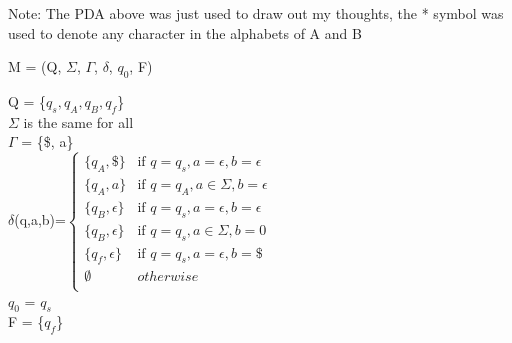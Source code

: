 \documentclass[12pt]{report}
\begin{document}
\begin{flushleft}
	{\footnotesize Note: The PDA above was just used to draw out my thoughts, the * symbol was used to denote any character in the alphabets of A and B}
\end{flushleft}

\pagebreak

M = (Q, $\Sigma$, $\Gamma$, $\delta$, $q_0$, F)
\begin{addmargin}[1cm]{0em}
	Q = \{$q_s, q_A, q_B, q_f$\}\\
	$\Sigma$ is the same for all\\
	$\Gamma$ = \{\$, a\}\\
	$\delta$(q,a,b)=$\begin{cases}
	\{q_A, \$\} &\text{if }q  = q_s, a = \epsilon, b = \epsilon\\
	\{q_A, a\} &\text{if }q  = q_A, a \in \Sigma, b = \epsilon\\
	\{q_B, \epsilon\} &\text{if }q  = q_s, a = \epsilon, b = \epsilon\\
	\{q_B, \epsilon\} &\text{if }q  = q_s, a \in \Sigma, b = 0\\
	\{q_f, \epsilon\} &\text{if }q  = q_s, a = \epsilon, b = \$\\
	\emptyset &otherwise\\
	\end{cases}$\\
	$q_0$ = $q_s$\\
	F = \{$q_f$\}\\
\end{addmargin}
\end{document}
